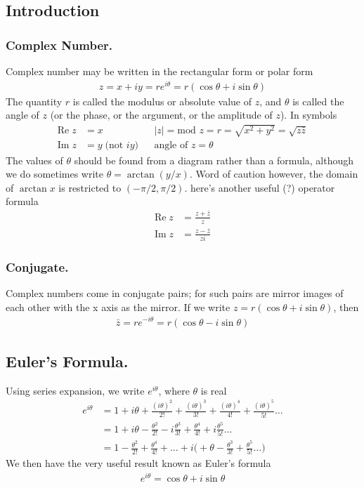 \documentclass[../main.tex]{subfiles}
\begin{document}
\subsection*{Introduction}
\subsubsection*{Complex Number.} Complex number may be written in the rectangular form or polar form
\begin{align*}
    z=x+i y=re^{i\theta}=r(\cos\theta+i\sin\theta)
\end{align*}
The quantity $r$ is called the modulus or absolute value of $z$, and $\theta$ is called the angle of $z$ (or the phase, or the argument, or the amplitude of $z$). In symbols
\begin{align*}
    \mathrm{Re}\; z&=x&&    |z|=\text{mod } z=r=\sqrt{x^2+y^2}=\sqrt{z\bar{z}}\\
    \mathrm{Im}\; z&=y\;\textrm{(not $iy$)}&&\text{angle of } z=\theta
\end{align*}
The values of $\theta$ should be found from a diagram rather than a formula, although we do sometimes write $\theta = \arctan(y/x)$. Word of caution however, the domain of $\arctan x$ is restricted to $(-\pi/2, \pi/2)$. here's another useful (?) operator formula
\begin{align*}
    \mathrm{Re}\; z&=\frac{z+\bar{z}}{z}\\
    \mathrm{Im}\; z&=\frac{z-\bar{z}}{zi}
\end{align*}

\subsubsection*{Conjugate.} Complex numbers come in conjugate pairs; for such pairs are mirror images of each other with the x axis as the mirror. If we write $z = r(\cos \theta + i \sin \theta)$, then
\begin{align*}
    \bar{z}=re^{-i\theta}=r(\cos\theta-i\sin\theta)
\end{align*}

\subsection*{Euler's Formula.} Using series expansion, we write $e^{i\theta}$, where $\theta$ is real
\begin{align*}
    e^{i\theta}&=1+i\theta+\frac{(i\theta)^2}{2!}+\frac{(i\theta)^3}{3!}+\frac{(i\theta)^4}{4!}+\frac{(i\theta)^5}{5!}\dots\\
    &=1+i\theta- \frac{\theta^2}{2!}-i\frac{\theta^3}{3!}+\frac{\theta^4}{4!}+i\frac{\theta^5}{5!}\dots\\
    &=1- \frac{\theta^2}{2!}+\frac{\theta^4}{4!}+\dots+i\biggl(+\theta-\frac{\theta^3}{3!}+\frac{\theta^5}{5!}\dots\biggr)
\end{align*}
We then have the very useful result known as Euler's formula
\begin{align*}
    e^{i\theta}=\cos\theta+i\sin\theta\\
\end{align*}
\end{document}
